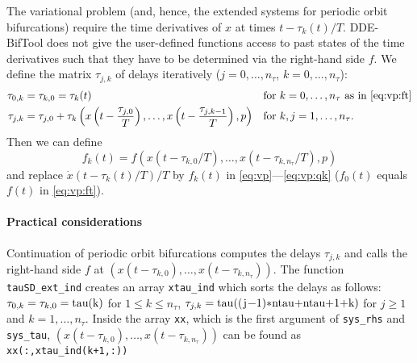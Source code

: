 \documentclass[11pt]{scrartcl}
\newcommand{\mlvar}[1]{\lstinline[keywordstyle=\color{var}]!#1!}
\newcommand{\blist}[1]{\mbox{\lstinline!#1!}}
\begin{document}
The variational problem (and, hence, the extended systems for periodic
orbit bifurcations) require the time derivatives of $x$ at times
$t-\tau_k(t)/T$. DDE-BifTool does not give the user-defined functions
access to past states of the time derivatives such that they have to
be determined via the right-hand side $f$.  We define the matrix
$\tau_{j,k}$ of delays iteratively ($j=0,\ldots,n_\tau$,
$k=0,\ldots,n_\tau$):
\begin{align}
  \label{eq:tau0jdef}
  \tau_{0,k}&=\tau_{k,0}=\tau_k(t)&&\mbox{for $k=0,\ldots,n_\tau$ as
     in
    \eqref{eq:vp:ft}}\\
  \tau_{j,k}&=\tau_{j,0}+\tau_k\left(x\left(t-\frac{\tau_{j,0}}{T}\right),
      \ldots,x\left(t-\frac{\tau_{j,k-1}}{T}\right),p\right)&&\mbox{for
        $k,j=1,\ldots,n_\tau$.}
\end{align}
Then we can define
\begin{equation}
  \label{eq:ftkdef}
  f_k(t)=f(x(t-\tau_{k,0}/T),\ldots,x(t-\tau_{k,n_\tau}/T),p)
\end{equation}
and replace $\dot x(t-\tau_k(t)/T)/T$ by $f_k(t)$ in
\eqref{eq:vp}---\eqref{eq:vp:qk} ($f_0(t)$ equals $f(t)$ in \eqref{eq:vp:ft}).

\paragraph{Practical considerations} Continuation of periodic orbit
bifurcations computes the delays $\tau_{j,k}$ and calls the right-hand
side $f$ at $(x(t-\tau_{k,0}),\ldots,x(t-\tau_{k,n_\tau}))$. The
function \mlvar{tauSD_ext_ind} creates an array \mlvar{xtau_ind} which
sorts the delays as follows: $\tau_{0,k}=\tau_{k,0}=\blist{tau(k)}$
for $1\leq k\leq n_\tau$,
$\tau_{j,k}=\blist{tau((j-1)*ntau+ntau+1+k)}$ for $j\geq1$ and
$k=1,\ldots,n_\tau$. Inside the array \mlvar{xx}, which is the first
argument of \blist{sys_rhs} and \blist{sys_tau},
$(x(t-\tau_{k,0}),\ldots,x(t-\tau_{k,n_\tau}))$ can be found as
\blist{xx(:,xtau_ind(k+1,:))}
\end{document}
